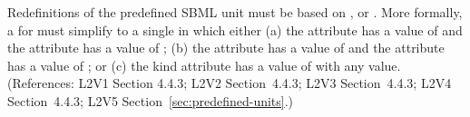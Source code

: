 Redefinitions of the predefined SBML unit  must be
based on ,  or .  More
formally, a \UnitDefinition for  must simplify to a single
\Unit in which either (a) the  attribute has
a value of  and the  attribute has a value of
; (b) the  attribute has a value of
 and the  attribute has a value of ; or
(c) the kind attribute has a value of  with
any  value.  (References: L2V1 Section 4.4.3; L2V2
Section~4.4.3; L2V3 Section~4.4.3; L2V4 Section~4.4.3; L2V5
Section~\ref{sec:predefined-units}.)
